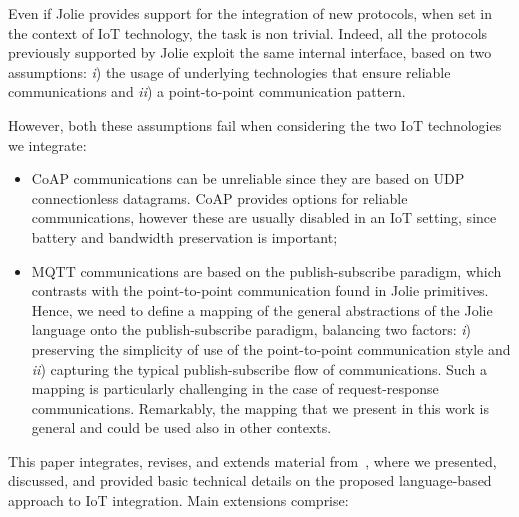 Even if Jolie provides support for the integration of new protocols, when set
in the context of IoT technology, the task is non trivial. Indeed, all the
protocols previously supported by Jolie exploit the same internal interface,
based on two assumptions: \emph{i}) the usage of underlying technologies that
ensure reliable communications and \emph{ii}) a point-to-point communication
pattern.

However, both these assumptions fail when considering the two IoT technologies
we integrate:

\begin{itemize}
 \item CoAP communications can be unreliable since they are based on UDP
       connectionless datagrams. CoAP provides options for reliable communications,
       however these are usually disabled in an IoT setting, since battery and
       bandwidth preservation is important;

 \item MQTT communications are based on the publish-subscribe paradigm, which
       contrasts with the point-to-point communication found in Jolie primitives.
       Hence, we need to define a mapping of the general abstractions of the Jolie
       language onto the publish-subscribe paradigm, balancing two factors: \emph{i})
       preserving the simplicity of use of the point-to-point communication style and
       \emph{ii}) capturing the typical publish-subscribe flow of communications. Such
       a mapping is particularly challenging in the case of request-response
       communications. Remarkably, the mapping that we present in this work is general
       and could be used also in other contexts.
\end{itemize}

This paper integrates, revises, and extends material
from~\cite{GabbrielliGLZ18}, where we presented, discussed, and provided basic
technical details on the proposed language-based approach to IoT integration.
Main extensions comprise:

